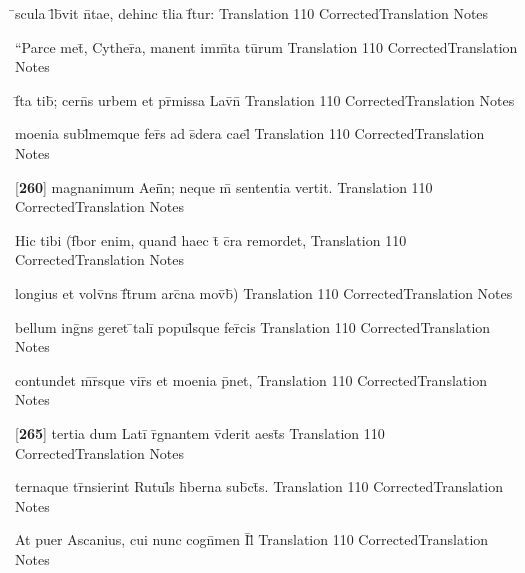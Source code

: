 \documentclass[]{book}
\begin{document}
\latline
  {\={}scula l\={\macron {\i}}b\={}vit n\={}tae, dehinc t\={}lia f\={}tur:}
  { Translation }
  {110}
  { CorrectedTranslation }
  { Notes }


\latline
  {``Parce met\={}, Cyther\={}a, manent imm\={}ta tu\={}rum}
  { Translation }
  {110}
  { CorrectedTranslation }
  { Notes }


\latline
  {f\={}ta tib\={\macron {\i}}; cern\={}s urbem et pr\={}missa Lav\={\macron {\i}}n\={\macron {\i}}}
  { Translation }
  {110}
  { CorrectedTranslation }
  { Notes }


\latline
  {moenia subl\={\macron {\i}}memque fer\={}s ad s\={\macron {\i}}dera cael\={\macron {\i}}}
  { Translation }
  {110}
  { CorrectedTranslation }
  { Notes }


\latline
  {[\textbf{260}] magnanimum Aen\={}\={}n; neque m\={} sententia vertit.}
  { Translation }
  {110}
  { CorrectedTranslation }
  { Notes }


\latline
  {Hic tibi (f\={}bor enim, quand\={} haec t\={} c\={}ra remordet,}
  { Translation }
  {110}
  { CorrectedTranslation }
  { Notes }


\latline
  {longius et volv\={}ns f\={}t\={}rum arc\={}na mov\={}b\={})}
  { Translation }
  {110}
  { CorrectedTranslation }
  { Notes }


\latline
  {bellum ing\={}ns geret \={}tali\={} popul\={}sque fer\={}cis}
  { Translation }
  {110}
  { CorrectedTranslation }
  { Notes }


\latline
  {contundet m\={}r\={}sque vir\={\macron {\i}}s et moenia p\={}net,}
  { Translation }
  {110}
  { CorrectedTranslation }
  { Notes }


\latline
  {[\textbf{265}] tertia dum Lati\={} r\={}gnantem v\={\macron {\i}}derit aest\={}s}
  { Translation }
  {110}
  { CorrectedTranslation }
  { Notes }


\latline
  {ternaque tr\={}nsierint Rutul\={\macron {\i}}s h\={\macron {\i}}berna sub\={}ct\={\macron {\i}}s.}
  { Translation }
  {110}
  { CorrectedTranslation }
  { Notes }


\latline
  {At puer Ascanius, cui nunc cogn\={}men I\={}l\={}}
  { Translation }
  {110}
  { CorrectedTranslation }
  { Notes }
\end{document}
